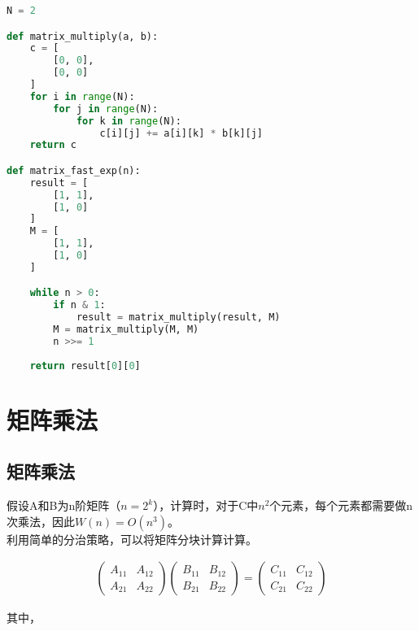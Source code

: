 
\begin{lstlisting}[language=Python]
N = 2

def matrix_multiply(a, b):
    c = [
        [0, 0],
        [0, 0]
    ]
    for i in range(N):
        for j in range(N):
            for k in range(N):
                c[i][j] += a[i][k] * b[k][j]
    return c

def matrix_fast_exp(n):
    result = [
        [1, 1],
        [1, 0]
    ]
    M = [
        [1, 1],
        [1, 0]
    ]

    while n > 0:
        if n & 1:
            result = matrix_multiply(result, M)
        M = matrix_multiply(M, M)
        n >>= 1
    
    return result[0][0]
\end{lstlisting}

\newpage

\section{矩阵乘法}

\subsection{矩阵乘法}

假设A和B为n阶矩阵（$ n = 2^k $），计算时，对于C中$ n^2 $个元素，每个元素都需要做n次乘法，因此$ W(n) = O(n^3) $。\\

利用简单的分治策略，可以将矩阵分块计算计算。

\vspace{-0.5cm}

\begin{align*}
	\left( \begin{matrix}
		A_{11} & A_{12} \\
		A_{21} & A_{22}
	\end{matrix} \right)
	\left( \begin{matrix}
		B_{11} & B_{12} \\
		B_{21} & B_{22}
	\end{matrix} \right)
	=
	\left( \begin{matrix}
		C_{11} & C_{12} \\
		C_{21} & C_{22}
	\end{matrix} \right)
\end{align*}

其中，

\vspace{-1cm}

